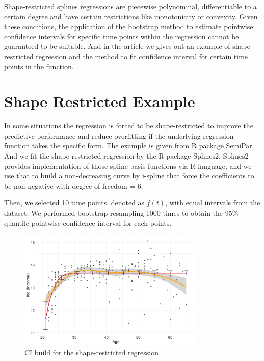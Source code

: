 \documentclass[12pt]{article}
\begin{document}
Shape-restricted splines regressions are piecewise polynominal, 
differentiable to a certain degree and have certain restrictions like 
monotonicity or convexity. Given these conditions, the application of 
the bootstrap method to estimate pointwise confidence intervals for 
specific time points within the regression cannot be guaranteed to 
be suitable. And in the article we gives out an example of 
shape-restricted regression and the method to fit confidence interval
for certain time points in the function.









\section{Shape Restricted Example}
\label{Shape Restricted Example}

In some situations the regression is forced to be shape-restricted to improve 
the predictive performance and reduce overfitting if the underlying regression
function takes the specific form. The example is given from R package SemiPar.
And we fit the shape-restricted regression by the R package Splines2. Splines2
provides implementation of those spline basis functions via R language, and 
we use that to build a non-decreasing curve by i-spline that force the 
coefficients to be non-negative with degree of freedom = 6.

Then, we selected 10 time points, denoted as $f(t)$, with equal intervals 
from the dataset. We performed bootstrap resampling 1000 times to obtain the 
95\% quantile pointwise confidence interval for each points.

\begin{figure}[H]
  \centering
  \includegraphics[width=0.8\textwidth]{SemiparCI.png}
  \caption{CI build for the shape-restricted regression}
  \label{fig:semipar}
\end{figure}
\end{document}
